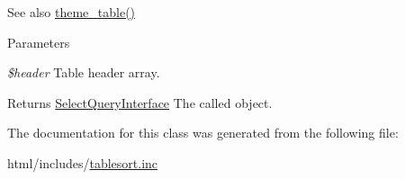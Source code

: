 \begin{DoxySeeAlso}{See also}
\hyperlink{group__themeable_ga9e35aa108c35f87b588197138a51823d}{theme\_\-table()} 
\end{DoxySeeAlso}

\begin{DoxyParams}{Parameters}
\item[{\em \$header}]Table header array. \end{DoxyParams}
\begin{DoxyReturn}{Returns}
\hyperlink{interfaceSelectQueryInterface}{SelectQueryInterface} The called object. 
\end{DoxyReturn}


The documentation for this class was generated from the following file:\begin{DoxyCompactItemize}
\item 
html/includes/\hyperlink{tablesort_8inc}{tablesort.inc}\end{DoxyCompactItemize}
